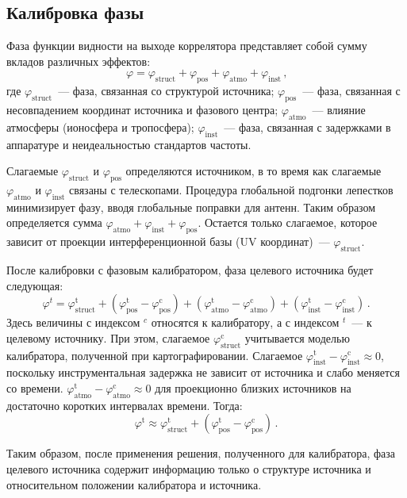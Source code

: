 \subsection{Калибровка фазы}
Фаза функции видности на выходе коррелятора представляет собой сумму вкладов различных эффектов:
\[
 \varphi = \varphi_\mathrm{struct} + \varphi_\mathrm{pos} + \varphi_\mathrm{atmo} +
\varphi_\mathrm{inst} \, \text{,}
\]
где $\varphi_\mathrm{struct}$~--- фаза, связанная со структурой источника;
$\varphi_\mathrm{pos}$~--- фаза, связанная с несовпадением координат источника и фазового центра;
$\varphi_\mathrm{atmo}$~--- влияние атмосферы (ионосфера и тропосфера); $\varphi_\mathrm{inst}$~---
фаза, связанная с задержками в аппаратуре и неидеальностью стандартов частоты.

Слагаемые $\varphi_\mathrm{struct}$ и $\varphi_\mathrm{pos}$ определяются источником, в то время
как слагаемые $\varphi_\mathrm{atmo}$ и $\varphi_\mathrm{inst}$ связаны с телескопами. Процедура
глобальной подгонки лепестков минимизирует фазу, вводя глобальные поправки для антенн. Таким
образом определяется сумма $\varphi_\mathrm{atmo} + \varphi_\mathrm{inst} + \varphi_\mathrm{pos}$.
Остается только слагаемое, которое зависит от проекции интерференционной базы (UV координат)~---
$\varphi_\mathrm{struct}$.

После калибровки с фазовым калибратором, фаза целевого источника будет следующая:
\[
 \varphi^{t} = \varphi_\mathrm{struct}^\mathrm{t} + (\varphi_\mathrm{pos}^\mathrm{t} -
\varphi_\mathrm{pos}^\mathrm{c}) + (\varphi_\mathrm{atmo}^\mathrm{t} -
\varphi_\mathrm{atmo}^\mathrm{c}) +  (\varphi_\mathrm{inst}^\mathrm{t} -
\varphi_\mathrm{inst}^\mathrm{c}) \,.
\]
Здесь величины с индексом $^c$ относятся к калибратору, а с индексом $^t$~--- к целевому источнику.
При этом, слагаемое $\varphi_\mathrm{struct}^\mathrm{c}$ учитывается моделью калибратора, полученной
при картографировании. Слагаемое $\varphi_\mathrm{inst}^\mathrm{t} -
\varphi_\mathrm{inst}^\mathrm{c} \approx 0$, поскольку инструментальная задержка не зависит от
источника и слабо меняется со времени. $\varphi_\mathrm{atmo}^\mathrm{t} -
\varphi_\mathrm{atmo}^\mathrm{c} \approx 0$ для проекционно близких источников на достаточно
коротких интервалах времени. Тогда:
\[
 \varphi^\mathrm{t} \approx \varphi_\mathrm{struct}^\mathrm{t} + (\varphi_\mathrm{pos}^\mathrm{t} -
\varphi_\mathrm{pos}^\mathrm{c}) \,\text{.}
\]

Таким образом, после применения решения, полученного для калибратора, фаза целевого источника
содержит информацию только о структуре источника и относительном положении калибратора и источника.

